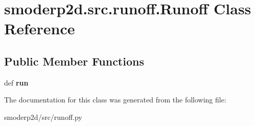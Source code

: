 \hypertarget{classsmoderp2d_1_1src_1_1runoff_1_1Runoff}{\section{smoderp2d.\-src.\-runoff.\-Runoff Class Reference}
\label{classsmoderp2d_1_1src_1_1runoff_1_1Runoff}
}
\subsection*{Public Member Functions}
\begin{DoxyCompactItemize}
\item 
\hypertarget{classsmoderp2d_1_1src_1_1runoff_1_1Runoff_a2c45be9fe5ed3087844b8712830865e4}{def {\bfseries run}}\label{classsmoderp2d_1_1src_1_1runoff_1_1Runoff_a2c45be9fe5ed3087844b8712830865e4}

\end{DoxyCompactItemize}


The documentation for this class was generated from the following file\-:\begin{DoxyCompactItemize}
\item 
smoderp2d/src/runoff.\-py\end{DoxyCompactItemize}
